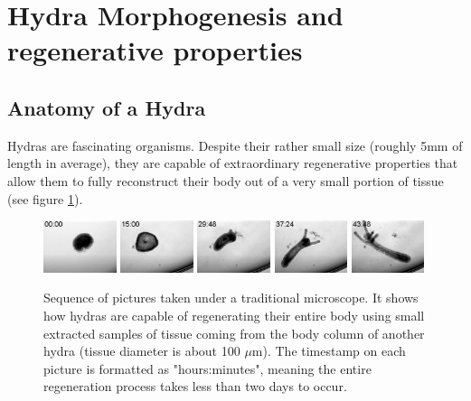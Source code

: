 
\section{Hydra Morphogenesis and regenerative properties}

\subsection{Anatomy of a Hydra}

Hydras are fascinating organisms. Despite their rather small size (roughly 5mm of length in average), they are capable of extraordinary regenerative properties that allow them to fully reconstruct their body out of a very small portion of tissue (see figure \ref{hydraregen}).
\begin{figure}
\label{hydraregen}
\includegraphics[width=0.19\textwidth]{figures/hydra_growth1}
\includegraphics[width=0.19\textwidth]{figures/hydra_growth2}
\includegraphics[width=0.19\textwidth]{figures/hydra_growth3}	\includegraphics[width=0.19\textwidth]{figures/hydra_growth4}
\includegraphics[width=0.19\textwidth]{figures/hydra_growth5}
\caption{Sequence of pictures taken under a traditional microscope. It shows how hydras are capable of regenerating their entire body using small extracted samples of tissue coming from the body column of another hydra (tissue diameter is about 100 $\mu$m). The timestamp on each picture is formatted as "hours:minutes", meaning the entire regeneration process takes less than two days to occur.}
\end{figure}

